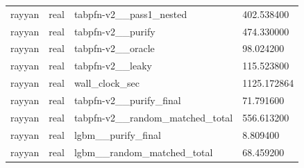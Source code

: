 \begin{tabular}{llll}
rayyan & real & tabpfn-v2\_\_pass1\_nested & 402.538400 \\
rayyan & real & tabpfn-v2\_\_purify & 474.330000 \\
rayyan & real & tabpfn-v2\_\_oracle & 98.024200 \\
rayyan & real & tabpfn-v2\_\_leaky & 115.523800 \\
rayyan & real & wall\_clock\_sec & 1125.172864 \\
rayyan & real & tabpfn-v2\_\_purify\_final & 71.791600 \\
rayyan & real & tabpfn-v2\_\_random\_matched\_total & 556.613200 \\
rayyan & real & lgbm\_\_purify\_final & 8.809400 \\
rayyan & real & lgbm\_\_random\_matched\_total & 68.459200 \\
\hline
\end{tabular}

